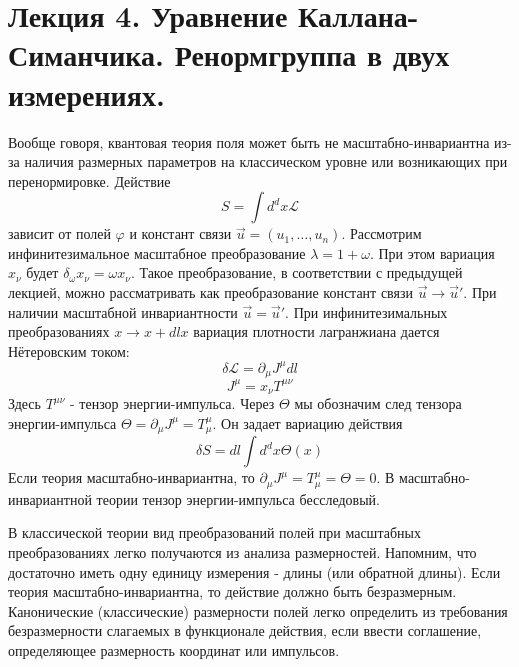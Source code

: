 \documentclass[a4paper,12pt]{article}
\theoremstyle{definition}
\theoremstyle{definition}
\theoremstyle{definition}
\begin{document}
\section{Лекция 4. Уравнение Каллана-Симанчика. Ренормгруппа в двух измерениях.}
\label{sec:lecture-4}

Вообще говоря, квантовая теория поля может быть не масштабно-инвариантна из-за наличия размерных параметров на классическом уровне или возникающих при перенормировке. Действие
\begin{equation}
  \label{eq:73}
  S=\int d^dx \mathcal{L}
\end{equation}
зависит от полей $\varphi$ и констант связи $\vec u=(u_1,\dots,u_n)$. Рассмотрим инфинитезимальное масштабное преобразование $\lambda=1+\omega$. При этом вариация $x_{\nu}$ будет $\delta_{\omega}x_{\nu}=\omega x_{\nu}$. Такое преобразование, в соответствии с предыдущей лекцией,  можно рассматривать как преобразование констант связи $\vec u\to \vec u'$. При наличии масштабной инвариантности $\vec u = \vec u'$. При инфинитезимальных преобразованиях $x\to x+dl x$ вариация плотности лагранжиана дается Нётеровским током:
\begin{equation}
  \label{eq:74}
  \delta\mathcal{L}=\partial_{\mu}J^{\mu}dl
\end{equation}
\begin{equation}
  \label{eq:75}
  J^{\mu}=x_{\nu}T^{\mu\nu}
\end{equation}
Здесь $T^{\mu\nu}$ - тензор энергии-импульса.  Через $\Theta$ мы обозначим след тензора энергии-импульса $\Theta=\partial_{\mu}J^{\mu}=T_{\mu}^{\mu}$. Он задает вариацию действия
\begin{equation}
  \label{eq:87}
  \delta S=dl \int d^d x \Theta(x)
\end{equation}
Если теория масштабно-инвариантна, то $\partial_{\mu}J^{\mu}=T_{\mu}^{\mu}=\Theta=0$. В масштабно-инвариантной теории тензор энергии-импульса бесследовый.

В классической теории вид преобразований полей при масштабных преобразованиях легко получаются из анализа размерностей. Напомним, что достаточно иметь одну единицу измерения - длины (или обратной длины). Если теория масштабно-инвариантна, то действие должно быть безразмерным. Канонические (классические) размерности полей легко определить из требования безразмерности слагаемых в функционале действия, если ввести соглашение, определяющее размерность координат или импульсов.
\end{document}
